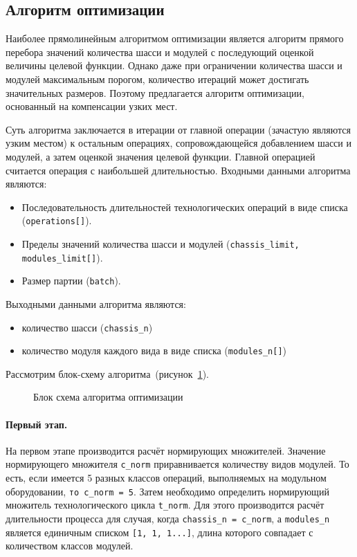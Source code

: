 \subsection{Алгоритм оптимизации}

Наиболее прямолинейным алгоритмом оптимизации является алгоритм прямого перебора значений количества шасси и модулей с последующий оценкой величины целевой функции. Однако даже при ограничении количества шасси и модулей максимальным порогом, количество итераций может достигать значительных размеров. Поэтому предлагается алгоритм оптимизации, основанный на компенсации узких мест.

Суть алгоритма заключается в итерации от главной операции (зачастую являются узким местом) к остальным операциях, сопровождающейся добавлением шасси и модулей, а затем оценкой значения целевой функции. Главной операцией считается операция с наибольшей длительностью. Входными данными алгоритма являются:

\begin{itemize}
	\item Последовательность длительностей технологических операций в виде списка (\texttt{operations[]}).
	\item Пределы значений количества шасси и модулей (\texttt{chassis\_limit, modules\_limit[]}).
	\item Размер партии (\texttt{batch}).
\end{itemize}


Выходными данными алгоритма являются:
\begin{itemize}
	\item количество шасси (\texttt{chassis\_n})
	\item количество модуля каждого вида в виде списка (\texttt{modules\_n[]})
\end{itemize}


Рассмотрим блок-схему алгоритма~(рисунок~\cref{fig:algo-1}).

\begin{figure}[!b]
	\caption{Блок схема алгоритма оптимизации}\label{fig:algo-1}
\end{figure}


\paragraph{Первый этап.} На первом этапе производится расчёт нормирующих множителей. Значение нормирующего множителя \texttt{c\_norm} приравнивается  количеству видов модулей. То есть, если имеется 5 разных классов операций, выполняемых на модульном оборудовании, \texttt{то c\_norm = 5}. Затем необходимо определить нормирующий множитель технологического цикла \texttt{t\_norm}. Для этого производится расчёт длительности процесса для случая, когда \texttt{chassis\_n = c\_norm}, а \texttt{modules\_n} является единичным списком \texttt{[1, 1, 1...]}, длина которого совпадает с количеством классов модулей.  
 
